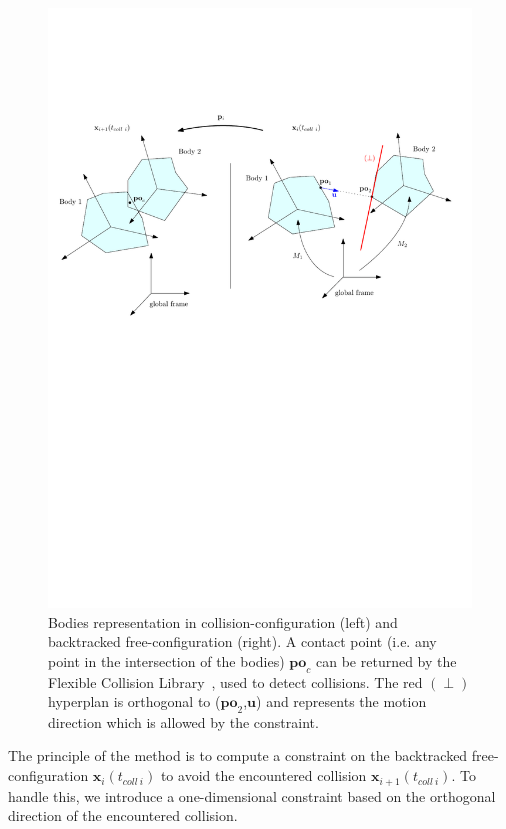 \documentclass{tADR2e}
\newcommand\xx{\mathbf{x}} %
\newcommand\tcolli{t_{coll\ i}}
\newcommand\po{\mathbf{po}}
\begin{document}
\begin{figure}[t]
	\centering
	\includegraphics[width=15.8cm]{contact-points.pdf}
	\caption{Bodies representation in collision-configuration (left) and 
	backtracked free-configuration (right). A contact point (i.e. any point in 
	the intersection of the bodies) $\po_c$ can be returned by the Flexible 
	Collision Library~\cite{fcl}, used to detect collisions. The red $(\perp)$ 
	hyperplan is orthogonal to ($\po_2$,$\mathbf{u}$) and represents the motion 
	direction which is allowed by the constraint.}
	\label{contact-points}
\end{figure}

The principle of the method is to compute a constraint on the backtracked free-
configuration $\xx_{i}(\tcolli)$ to avoid the encountered collision $\xx_{i+1}
(\tcolli)$. To handle this, we introduce a one-dimensional constraint based on the 
orthogonal direction of the encountered collision.
\end{document}
